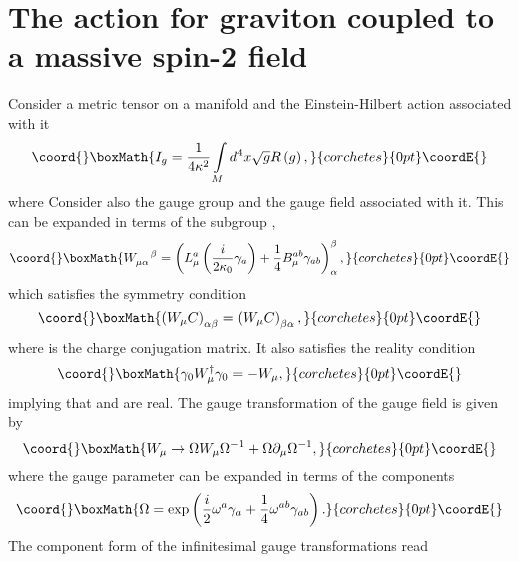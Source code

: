 \documentclass[a4paper,12pt]{article}
\begin{document}
\section{The action for graviton coupled to a massive spin-2 field}

Consider a metric tensor \coordHE{} on a manifold \coordHE{} and the
Einstein-Hilbert action associated with it%
\[\coord{}\boxMath{
I_{g}=\frac{1}{4\kappa^{2}}\int\limits_{M}d^{4}x\sqrt{g}R\left(  g\right)  ,
}{corchetes}{0pt}\coordE{}\]
where \coordHE{} Consider also the gauge group \coordHE{} and the
gauge field \coordHE{} associated with it. This can be expanded in terms of the
\coordHE{} subgroup \cite{ch}, \cite{css}%
\[\coord{}\boxMath{
W_{\mu\alpha}^{\quad\beta}=\left(  L_{\mu}^{a}\left(  \frac{i}{2\kappa_{0}%
}\gamma_{a}\right)  +\frac{1}{4}B_{\mu}^{ab}\gamma_{ab}\right)  _{\alpha
}^{\beta},
}{corchetes}{0pt}\coordE{}\]
which satisfies the symmetry condition
\[\coord{}\boxMath{
\left(  W_{\mu}C\right)  _{\alpha\beta}=\left(  W_{\mu}C\right)  _{\beta
\alpha},
}{corchetes}{0pt}\coordE{}\]
where \coordHE{} is the charge conjugation matrix. It also satisfies the reality
condition
\[\coord{}\boxMath{
\gamma_{0}W_{\mu}^{\dagger}\gamma_{0}=-W_{\mu},
}{corchetes}{0pt}\coordE{}\]
implying that \coordHE{} and \coordHE{} are real. The \coordHE{} gauge
transformation of the gauge field is given by
\[\coord{}\boxMath{
W_{\mu}\rightarrow\Omega W_{\mu}\Omega^{-1}+\Omega\partial_{\mu}\Omega^{-1},
}{corchetes}{0pt}\coordE{}\]
where the gauge parameter \myHighlight{$\Omega$}\coordHE{} can be expanded in terms of the \coordHE{}
components%
\[\coord{}\boxMath{
\Omega=\exp\left(  \frac{i}{2}\omega^{a}\gamma_{a}+\frac{1}{4}\omega
^{ab}\gamma_{ab}\right)  .
}{corchetes}{0pt}\coordE{}\]
The component form of the infinitesimal gauge transformations read
\end{document}
